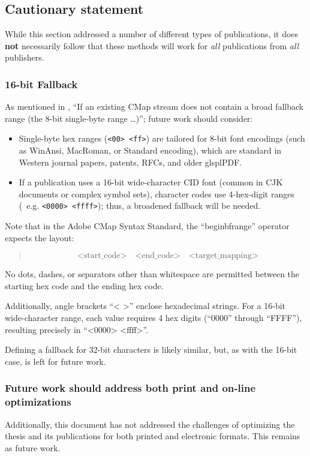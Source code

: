 \documentclass[12pt, twoside]{article}
\begin{document}
\subsection{Cautionary statement}
\label{sec:cautionaryStatement}

While this section addressed a number of different types of publications, it does \textbf{not} necessarily follow that these methods will work for \textit{all} publications from \textit{all} publishers.

\subsubsection{16-bit Fallback}
\label{sec:sixteenBitFallback}
As mentioned in , \enquote{If an existing CMap stream does not contain a broad fallback range (\ie the 8-bit single-byte range \ldots)}; future work should consider:
\begin{itemize}
    \item Single-byte hex ranges (\ie \texttt{<00> <ff>}) are tailored for 8-bit font encodings (such as WinAnsi, MacRoman, or Standard encoding), which are standard in Western journal papers, patents, \glspl{RFC}, and older glspl{PDF}.

    \item If a publication uses a 16-bit wide-character CID font (common in CJK documents or complex symbol sets), character codes use 4-hex-digit ranges (\ e.g. \texttt{<0000> <ffff>}); thus, a broadened fallback will be needed.
\end{itemize}

Note that in the Adobe CMap Syntax Standard, the \enquote{beginbfrange} operator expects the layout:
\begin{quotation}
$$\text{<start\_code>} \quad \text{<end\_code>} \quad \text{<target\_mapping>}$$
\end{quotation}

No dots, dashes, or separators other than whitespace are permitted between the starting hex code and the ending hex code.

Additionally, angle brackets \enquote{< >} enclose hexadecimal strings. For a 16-bit wide-character range, each value requires 4 hex digits (\eg \enquote{0000} through \enquote{FFFF}), resulting precisely in \enquote{<0000> <ffff>}.

Defining a fallback for 32-bit characters is likely similar, but, as with the 16-bit case, is left for future work.


\subsubsection{Future work should address both print and on-line optimizations}
\label{sec:futureWork}
Additionally, this document has not addressed the challenges of optimizing the thesis and its publications for both printed and electronic formats. This remains as future work.
\end{document}
